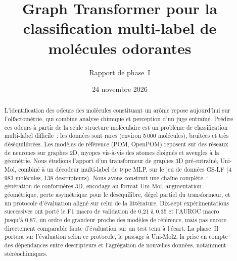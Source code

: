 \documentclass[11pt, french, screen, research-development]{report-rd-info}
\begin{document}
\title{Graph Transformer pour la classification multi-label de molécules odorantes}
\subtitle{Rapport de phase~I}
\date{24 novembre 2026}


\begin{abstract}
\small
L'identification des odeurs des molécules constituant un arôme repose aujourd'hui sur l'olfactométrie, qui combine analyse chimique et perception d'un juge entraîné.
Prédire ces odeurs à partir de la seule structure moléculaire est un problème de classification multi-label difficile~: les données sont rares (environ 5\,000 molécules), bruitées et très déséquilibrées.
Les modèles de référence (POM, OpenPOM) reposent sur des réseaux de neurones sur graphes 2D, myopes vis-à-vis des atomes éloignés et aveugles à la géométrie.
Nous étudions l'apport d'un transformeur de graphes 3D pré-entraîné, Uni-Mol, combiné à un décodeur multi-label de type MLP, sur le jeu de données GS-LF (4\,983 molécules, 138 descripteurs).
Nous avons construit une chaîne complète~: génération de conformères 3D, encodage au format Uni-Mol, augmentation géométrique, perte asymétrique pour le déséquilibre, dégel partiel du transformeur, et un protocole d'évaluation aligné sur celui de la littérature.
Dix-sept expérimentations successives ont porté le F1 macro de validation de 0,21 à 0,35 et l'AUROC macro jusqu'à 0,87, un ordre de grandeur proche des modèles de référence, mais pas encore directement comparable faute d'évaluation sur un test tenu à l'écart.
La phase~II portera sur l'évaluation selon ce protocole, le passage à Uni-Mol2, la prise en compte des dépendances entre descripteurs et l'agrégation de nouvelles données, notamment stéréochimiques.
\end{abstract}

\begin{classification}
\small
\end{classification}
\end{document}
